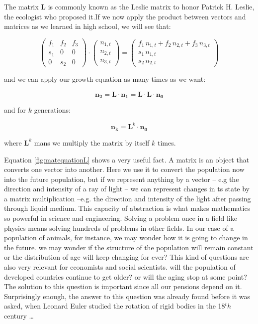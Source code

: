 \documentclass[12pt]{article}
\begin{document}
The matrix $\mathbf{L}$ is commonly known as the Leslie matrix to honor Patrick H. Leslie, the ecologist who proposed it.If we now apply the product between vectors and matrices as we learned in high school, we will see that:

\begin{equation}
	 	\begin{pmatrix}
		f_1	&f_2	&f_3	\\
		s_1	&0	&0	\\
		0	&s_2	&0
	\end{pmatrix} \cdot \begin{pmatrix} n_{1,t}\\ n_{2,t} \\ n_{3,t}\end{pmatrix} = \begin{pmatrix} f_1 \,n_{1,t} + f_2 \,n_{2,t} + f_3 \,n_{3,t}\\ s_1 \, n_{1,t} \\ s_2 \, n_{2,t}\end{pmatrix}
\end{equation}

and we can apply our growth equation as many times as we want:

\begin{equation}
	\mathbf{n_{2}} =\mathbf{L} \cdot \mathbf{n_1} = \mathbf{L} \cdot \mathbf{L} \cdot \mathbf{n_0} 
\end{equation}

and for $k$ generations:

\begin{equation}
	\mathbf{n_k} =\mathbf{L}^k \cdot \mathbf{n_0}
\end{equation}

where $\mathbf{L}^k$ mans we multiply the matrix by itself $k$ times.

Equation \ref{fig:matequationL} shows a very useful fact. A matrix is an object that converts one vector into another. Here we use it to convert the population now into the future population, but if we represent anything by a vector -- e.g the direction and intensity of a ray of light -- we can represent changes in ts state by a matrix multiplication --e.g. the direction and intensity of the light after passing through liquid medium. This capacity of abstraction is what makes mathematics so powerful in science and engineering. Solving a problem once in a field like physics means solving hundreds of problems in other fields. In our case of a population of animals, for instance, we may wonder how it is going to change in the future. we may wonder if the structure of the population will remain constant or the distribution of age will keep changing for ever? This kind of questions are also very relevant for economists and social scientists. will the population of developed countries continue to get older? or will the aging stop at some point? The solution to this question is important since all our pensions depend on it. Surprisingly enough, the answer to this question was already found before it was asked, when Leonard Euler studied the rotation of rigid bodies in the 18$^th$ century \dots 
\end{document}

